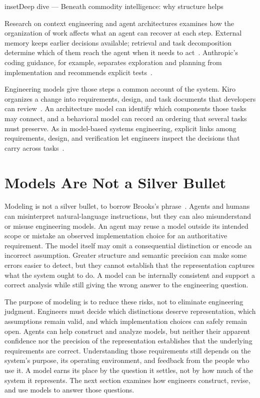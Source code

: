 \begin{bookbox}{inset}{Deep dive --- Beneath commodity intelligence: why structure helps}
\label{inset-beneath-commodity-intelligence}

Research on context engineering and agent architectures examines how the organization of work affects what an agent can recover at each step. External memory keeps earlier decisions available; retrieval and task decomposition determine which of them reach the agent when it needs to act~\citep{mei2025contextengineering,wang2024autonomousagents}. Anthropic’s coding guidance, for example, separates exploration and planning from implementation and recommends explicit tests~\citep{cherny2025agenticcoding}.

Engineering models give those steps a common account of the system. Kiro organizes a change into requirements, design, and task documents that developers can review~\citep{swaminathan2025kiro}. An architecture model can identify which components those tasks may connect, and a behavioral model can record an ordering that several tasks must preserve. As in model-based systems engineering, explicit links among requirements, design, and verification let engineers inspect the decisions that carry across tasks~\citep{madni2018mbse}.
\end{bookbox}

\section{Models Are Not a Silver Bullet}\label{heading:models-are-not-a-silver-bullet}

Modeling is not a silver bullet, to borrow Brooks’s phrase~\citep{brooks1987}. Agents and humans can misinterpret natural-language instructions, but they can also misunderstand or misuse engineering models. An agent may reuse a model outside its intended scope or mistake an observed implementation choice for an authoritative requirement. The model itself may omit a consequential distinction or encode an incorrect assumption. Greater structure and semantic precision can make some errors easier to detect, but they cannot establish that the representation captures what the system ought to do. A model can be internally consistent and support a correct analysis while still giving the wrong answer to the engineering question.

The purpose of modeling is to reduce these risks, not to eliminate engineering judgment. Engineers must decide which distinctions deserve representation, which assumptions remain valid, and which implementation choices can safely remain open. Agents can help construct and analyze models, but neither their apparent confidence nor the precision of the representation establishes that the underlying requirements are correct. Understanding those requirements still depends on the system’s purpose, its operating environment, and feedback from the people who use it. A model earns its place by the question it settles, not by how much of the system it represents. The next section examines how engineers construct, revise, and use models to answer those questions.
